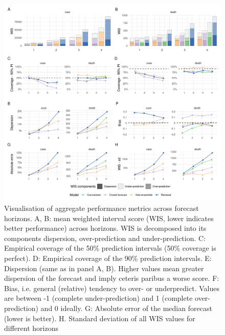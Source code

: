 \documentclass[
]{article}
\begin{document}
\begin{figure}[H]
\includegraphics[width=1\linewidth,]{../analysis/plots/aggregate-performance-all-v4} \caption{Visualisation of aggregate performance metrics across forecast horizons. A, B: mean weighted interval score (WIS, lower indicates better performance) across horizons. WIS is decomposed into its components dispersion, over-prediction and under-prediction. C: Empirical coverage of the 50\% prediction intervals (50\% coverage is perfect). D: Empirical coverage of the 90\% prediction intervals. E: Dispersion (same as in panel A, B). Higher values mean greater dispersion of the forecast and imply ceteris paribus a worse score. F: Bias, i.e. general (relative) tendency to over- or underpredict. Values are between -1 (complete under-prediction) and 1 (complete over-prediction) and 0 ideally. G: Absolute error of the median forecast (lower is better). H. Standard deviation of all WIS values for different horizons}\label{fig:agg-performance-all}
\end{figure}
\end{document}
